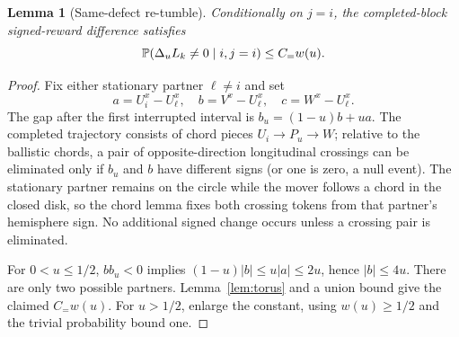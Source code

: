 \documentclass[11pt]{article}
\newtheorem{lemma}[theorem]{Lemma}
\theoremstyle{remark}\newtheorem{remark}[theorem]{Remark}
\begin{document}
\begin{lemma}[Same-defect re-tumble]\label{lem:same}
Conditionally on $j=i$, the completed-block signed-reward difference satisfies
\[\mathbb P(\Delta_u L_k\ne0\mid i,j=i)\le C_{=}w(u).\]
\end{lemma}
\begin{proof}
Fix either stationary partner $\ell\ne i$ and set
\[a=U_i^x-U_\ell^x,\quad b=V^x-U_\ell^x,\quad c=W^x-U_\ell^x.\]
The gap after the first interrupted interval is $b_u=(1-u)b+ua$. The completed trajectory consists of chord pieces $U_i\to P_u\to W$; relative to the ballistic chords, a pair of opposite-direction longitudinal crossings can be eliminated only if $b_u$ and $b$ have different signs (or one is zero, a null event). The stationary partner remains on the circle while the mover follows a chord in the closed disk, so the chord lemma fixes both crossing tokens from that partner's hemisphere sign. No additional signed change occurs unless a crossing pair is eliminated.

For $0<u\le1/2$, $bb_u<0$ implies $(1-u)|b|\le u|a|\le2u$, hence $|b|\le4u$. There are only two possible partners. Lemma~\ref{lem:torus} and a union bound give the claimed $C_{=}w(u)$. For $u>1/2$, enlarge the constant, using $w(u)\ge1/2$ and the trivial probability bound one.
\end{proof}
\end{document}
